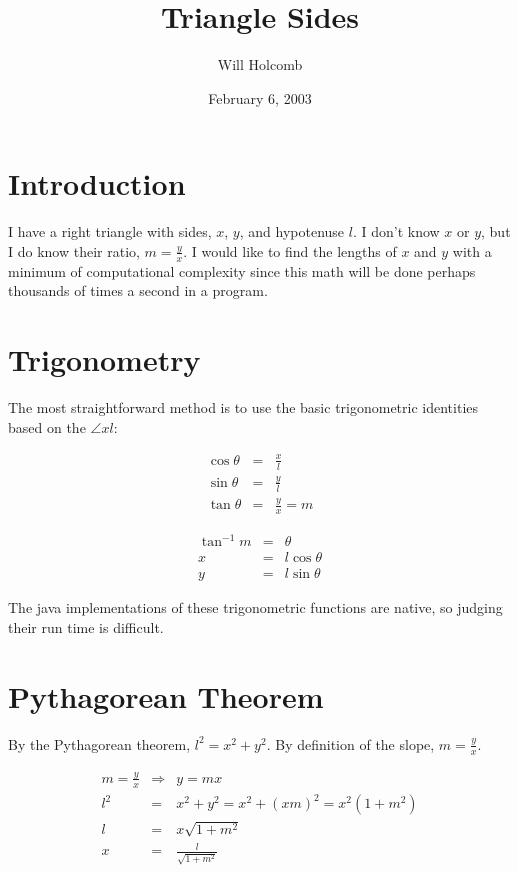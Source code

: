 \documentclass[12pt,a4paper,twoside]{article}  %
\author{Will Holcomb}
\title{Triangle Sides}
\date{February 6, 2003}
\begin{document}
\maketitle

\section{Introduction}

I have a right triangle with sides, $x$, $y$, and hypotenuse $l$. I
don't know $x$ or $y$, but I do know their ratio, $m = \frac{y}{x}$.
I would like to find the lengths of $x$ and $y$ with a minimum of
computational complexity since this math will be done perhaps
thousands of times a second in a program.

\section{Trigonometry}

The most straightforward method is to use the basic trigonometric
identities based on the $\angle xl$:

\begin{eqnarray}
\cos{\theta} &=& \frac{x}{l} \\
\sin{\theta} &=& \frac{y}{l} \\
\tan{\theta} &=& \frac{y}{x} = m
\end{eqnarray}

\begin{eqnarray}
\tan^{-1}{m} &=& \theta \\
x            &=& l \cos{\theta} \\
y            &=& l \sin{\theta}
\end{eqnarray}

The java implementations of these trigonometric functions are native,
so judging their run time is difficult.

\section{Pythagorean Theorem}

By the Pythagorean theorem, $l^2 = x^2 + y^2$. By definition of the
slope, $m = \frac{y}{x}$.

\begin{eqnarray}
m = \frac{y}{x} &\Rightarrow& y = mx \\
l^2 &=& x^2 + y^2 = x^2 + (xm)^2 = x^2 (1 + m^2) \\
l &=& x\sqrt{1 + m^2} \\
x &=& \frac{l}{\sqrt{1 + m^2}}
\end{eqnarray}
\end{document}
